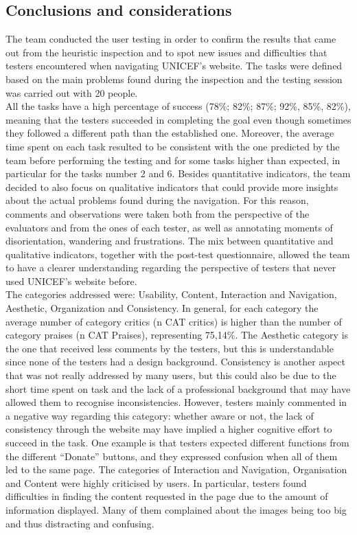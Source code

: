 
\subsection{Conclusions and considerations}

The team conducted the user testing in order to confirm the results that came out from the heuristic inspection and to spot new issues and difficulties that testers encountered when navigating UNICEF’s website. The tasks were defined based on the main problems found during the inspection and the testing session was carried out with 20 people.\\

All the tasks have a high percentage of success (78\%; 82\%; 87\%; 92\%, 85\%, 82\%), meaning that the testers succeeded in completing the goal even though sometimes they followed a different path than the established one. Moreover, the average time spent on each task resulted to be consistent with the one predicted by the team before performing the testing and for some tasks higher than expected, in particular for the tasks number 2 and 6.
Besides quantitative indicators, the team decided to also focus on qualitative indicators that could provide more insights about the actual problems found during the navigation. For this reason, comments and observations were taken both from the perspective of the evaluators and from the ones of each tester, as well as annotating moments of disorientation, wandering and frustrations. The mix between quantitative and qualitative indicators, together with the post-test questionnaire, allowed the team to have a clearer understanding regarding the perspective of testers that never used UNICEF’s website before.\\

The categories addressed were: Usability, Content, Interaction and Navigation, Aesthetic, Organization and Consistency. In general, for each category the average number of category critics (n CAT critics) is higher than the number of category praises (n CAT Praises), representing 75,14\%. The Aesthetic category is the one that received less comments by the testers, but this is understandable since none of the testers had a design background. Consistency is another aspect that was not really addressed by many users, but this could also be due to the short time spent on task and the lack of a professional background that may have allowed them to recognise inconsistencies. However, testers mainly commented in a negative way regarding this category: whether aware or not, the lack of consistency through the website may have implied a higher cognitive effort to succeed in the task. One example is that testers expected different functions from the different “Donate” buttons, and they expressed confusion when all of them led to the same page. 
The categories of Interaction and Navigation, Organisation and Content were highly criticised by users. In particular, testers found difficulties in finding the content requested in the page due to the amount of information displayed. Many of them complained about the images being too big and thus distracting and confusing.\\
 
